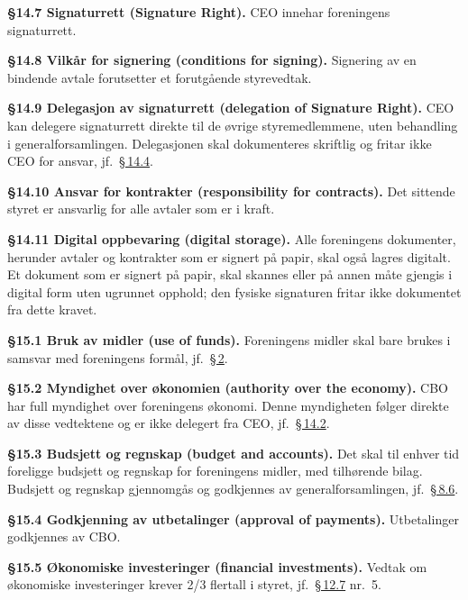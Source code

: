 \documentclass{../../../Common/Latex/Templates/rapport}
\begin{document}
\textbf{\S 14.7 Signaturrett (Signature Right).}\label{nbylaw:14.7} CEO innehar foreningens signaturrett.

\textbf{\S 14.8 Vilk\r{a}r for signering (conditions for signing).}\label{nbylaw:14.8} Signering av en bindende avtale forutsetter et forutg\r{a}ende styrevedtak.

\textbf{\S 14.9 Delegasjon av signaturrett (delegation of Signature Right).}\label{nbylaw:14.9} CEO kan delegere signaturrett direkte til de øvrige styremedlemmene, uten behandling i generalforsamlingen. Delegasjonen skal dokumenteres skriftlig og fritar ikke CEO for ansvar, jf.\ \hyperref[nbylaw:14.4]{\S\,14.4}.

\textbf{\S 14.10 Ansvar for kontrakter (responsibility for contracts).}\label{nbylaw:14.10} Det sittende styret er ansvarlig for alle avtaler som er i kraft.

\textbf{\S 14.11 Digital oppbevaring (digital storage).}\label{nbylaw:14.11} Alle foreningens dokumenter, herunder avtaler og kontrakter som er signert p\r{a} papir, skal ogs\r{a} lagres digitalt. Et dokument som er signert p\r{a} papir, skal skannes eller p\r{a} annen m\r{a}te gjengis i digital form uten ugrunnet opphold; den fysiske signaturen fritar ikke dokumentet fra dette kravet.


\label{nbylaw:15}
\textbf{\S 15.1 Bruk av midler (use of funds).}\label{nbylaw:15.1} Foreningens midler skal bare brukes i samsvar med foreningens form\r{a}l, jf.\ \hyperref[nbylaw:2]{\S\,2}.

\textbf{\S 15.2 Myndighet over økonomien (authority over the economy).}\label{nbylaw:15.2} CBO har full myndighet over foreningens økonomi. Denne myndigheten følger direkte av disse vedtektene og er ikke delegert fra CEO, jf.\ \hyperref[nbylaw:14.2]{\S\,14.2}.

\textbf{\S 15.3 Budsjett og regnskap (budget and accounts).}\label{nbylaw:15.3} Det skal til enhver tid foreligge budsjett og regnskap for foreningens midler, med tilhørende bilag. Budsjett og regnskap gjennomg\r{a}s og godkjennes av generalforsamlingen, jf.\ \hyperref[nbylaw:8.6]{\S\,8.6}.

\textbf{\S 15.4 Godkjenning av utbetalinger (approval of payments).}\label{nbylaw:15.4} Utbetalinger godkjennes av CBO.

\textbf{\S 15.5 Økonomiske investeringer (financial investments).}\label{nbylaw:15.5} Vedtak om økonomiske investeringer krever 2/3 flertall i styret, jf.\ \hyperref[nbylaw:12.7]{\S\,12.7} nr.\ 5.
\end{document}
